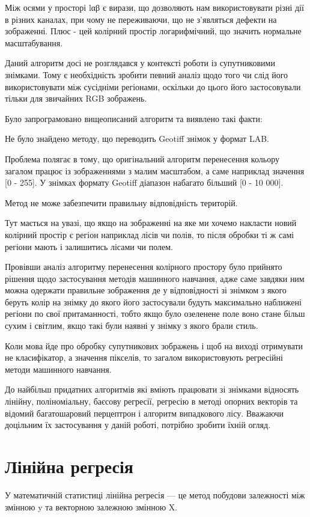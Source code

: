 Між осями у просторі lαβ є вирази, що дозволяють нам використовувати різні дії в різних каналах, при чому не переживаючи, що не з’являться дефекти на зображенні. Плюс - цей колірний простір логарифмічний, що значить нормальне масштабування.

Даний алгоритм \cite{ref8} досі не розглядався у контексті роботи із супутниковими знімками. Тому є необхідність зробити певний аналіз щодо того чи слід його використовувати між сусідніми регіонами, оскільки до цього його застосовували тільки для звичайних RGB зображень.

Було запрограмовано вищеописаний алгоритм та виявлено такі факти:

Не було знайдено методу, що переводить Geotiff знімок у формат LAB.

Проблема полягає в тому, що оригінальний алгоритм перенесення кольору загалом працює із зображеннями з малим масштабом, а саме наприклад значення [0 - 255]. У знімках формату Geotiff діапазон набагато більший [0 - 10 000].

Метод не може забезпечити правильну відповідність територій.

Тут мається на увазі, що якщо на зображенні на яке ми хочемо накласти новий колірний простір є регіон наприклад лісів чи полів, то після обробки ті ж самі регіони мають і залишитись лісами чи полем.

Провівши аналіз алгоритму перенесення колірного простору було прийнято рішення щодо застосування методів машинного навчання, адже саме завдяки ним можна одержати правильне зображення де у відповідності зі знімком з якого беруть колір на знімку до якого його застосували будуть максимально наближені регіони по свої притаманності, тобто якщо було озеленене поле воно стане більш сухим і світлим, якщо такі були наявні у знімку з якого брали стиль.

Коли мова йде про обробку супутникових зображень і щоб на виході отримувати не класифікатор, а значення пікселів, то загалом використовують регресійні методи \cite{ref9} машинного навчання.

До найбільш придатних алгоритмів які вміють працювати зі знімками відносять лінійну, поліноміальну, баєсову регресії, регресію в методі опорних векторів та відомий багатошаровий перцептрон і алгоритм випадкового лісу. Вважаючи доцільним їх застосування у даній роботі, потрібно зробити їхній огляд.

\section{Лінійна регресія}
У математичній статистиці лінійна регресія \cite{ref7} --- це метод побудови залежності між змінною y та векторною залежною змінною X.

